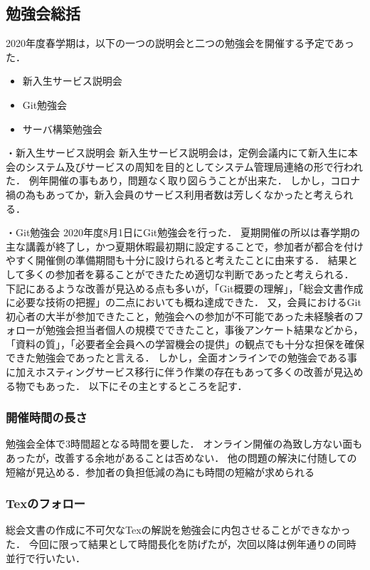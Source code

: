 \subsection*{勉強会総括}


2020年度春学期は，以下の一つの説明会と二つの勉強会を開催する予定であった．

\begin{itemize}
  \item 新入生サービス説明会
  \item Git勉強会
  \item サーバ構築勉強会
\end{itemize}

・新入生サービス説明会
新入生サービス説明会は，定例会議内にて新入生に本会のシステム及びサービスの周知を目的としてシステム管理局連絡の形で行われた．
例年開催の事もあり，問題なく取り図らうことが出来た．
しかし，コロナ禍の為もあってか，新入会員のサービス利用者数は芳しくなかったと考えられる．

・Git勉強会
2020年度8月1日にGit勉強会を行った．
夏期開催の所以は春学期の主な講義が終了し，かつ夏期休暇最初期に設定することで，参加者が都合を付けやすく開催側の準備期間も十分に設けられると考えたことに由来する．
結果として多くの参加者を募ることができたため適切な判断であったと考えられる．
下記にあるような改善が見込める点も多いが，「Git概要の理解」，「総会文書作成に必要な技術の把握」の二点においても概ね達成できた．
又，会員におけるGit初心者の大半が参加できたこと，勉強会への参加が不可能であった未経験者のフォローが勉強会担当者個人の規模でできたこと，事後アンケート結果などから，「資料の質」，「必要者全会員への学習機会の提供」の観点でも十分な担保を確保できた勉強会であったと言える．
しかし，全面オンラインでの勉強会である事に加えホスティングサービス移行に伴う作業の存在もあって多くの改善が見込める物でもあった．
以下にその主とするところを記す．
\subsubsection*{開催時間の長さ}
勉強会全体で3時間超となる時間を要した．
オンライン開催の為致し方ない面もあったが，改善する余地があることは否めない．
他の問題の解決に付随しての短縮が見込める．参加者の負担低減の為にも時間の短縮が求められる
\subsubsection*{Texのフォロー}
総会文書の作成に不可欠なTexの解説を勉強会に内包させることができなかった．
今回に限って結果として時間長化を防げたが，次回以降は例年通りの同時並行で行いたい．
